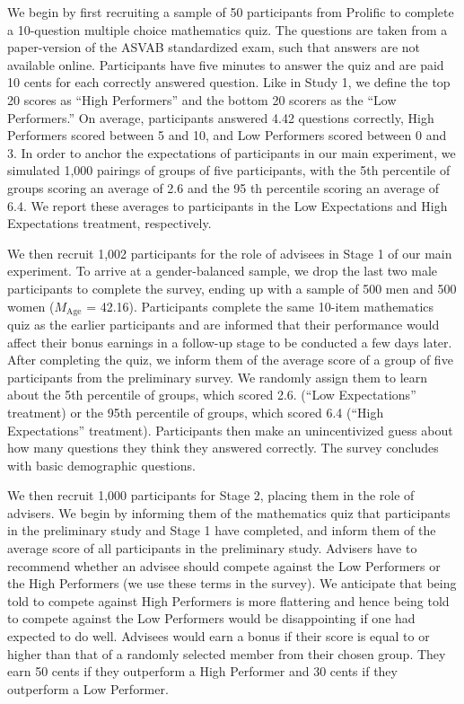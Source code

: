 \documentclass[
  man,
  floatsintext,
  longtable,
  nolmodern,
  notxfonts,
  notimes,
  colorlinks=true,linkcolor=blue,citecolor=blue,urlcolor=blue]{apa7}
\begin{document}
We begin by first recruiting a sample of 50 participants from Prolific
to complete a 10-question multiple choice mathematics quiz. The
questions are taken from a paper-version of the ASVAB standardized exam,
such that answers are not available online. Participants have five
minutes to answer the quiz and are paid 10 cents for each correctly
answered question. Like in Study 1, we define the top 20 scores as
``High Performers'' and the bottom 20 scorers as the ``Low Performers.''
On average, participants answered 4.42 questions correctly, High
Performers scored between 5 and 10, and Low Performers scored between 0
and 3. In order to anchor the expectations of participants in our main
experiment, we simulated 1,000 pairings of groups of five participants,
with the 5th percentile of groups scoring an average of 2.6 and the 95
th percentile scoring an average of 6.4. We report these averages to
participants in the Low Expectations and High Expectations treatment,
respectively.

We then recruit 1,002 participants for the role of advisees in Stage 1
of our main experiment. To arrive at a gender-balanced sample, we drop
the last two male participants to complete the survey, ending up with a
sample of 500 men and 500 women (\(M_{\text{Age}}\) = 42.16).
Participants complete the same 10-item mathematics quiz as the earlier
participants and are informed that their performance would affect their
bonus earnings in a follow-up stage to be conducted a few days later.
After completing the quiz, we inform them of the average score of a
group of five participants from the preliminary survey. We randomly
assign them to learn about the 5th percentile of groups, which scored
2.6. (``Low Expectations'' treatment) or the 95th percentile of groups,
which scored 6.4 (``High Expectations'' treatment). Participants then
make an unincentivized guess about how many questions they think they
answered correctly. The survey concludes with basic demographic
questions.

We then recruit 1,000 participants for Stage 2, placing them in the role
of advisers. We begin by informing them of the mathematics quiz that
participants in the preliminary study and Stage 1 have completed, and
inform them of the average score of all participants in the preliminary
study. Advisers have to recommend whether an advisee should compete
against the Low Performers or the High Performers (we use these terms in
the survey). We anticipate that being told to compete against High
Performers is more flattering and hence being told to compete against
the Low Performers would be disappointing if one had expected to do
well. Advisees would earn a bonus if their score is equal to or higher
than that of a randomly selected member from their chosen group. They
earn 50 cents if they outperform a High Performer and 30 cents if they
outperform a Low Performer.
\end{document}
